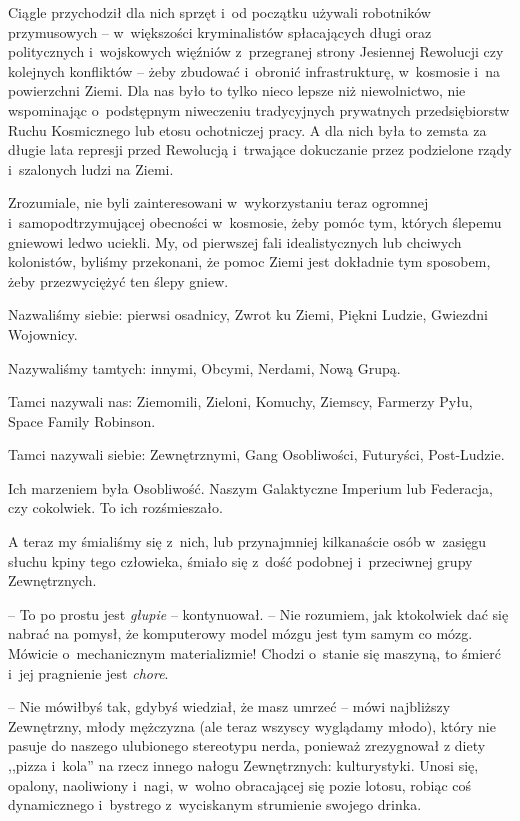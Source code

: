 \documentclass[oneside,polish,11pt,sfheadings]{mwbk}
\begin{document}
Ciągle przychodził dla nich sprzęt i~od początku używali robotników
przymusowych -- w~większości kryminalistów spłacających długi oraz
politycznych i~wojskowych więźniów z~przegranej strony Jesiennej
Rewolucji czy kolejnych konfliktów -- żeby zbudować i~obronić
infrastrukturę, w~kosmosie i~na powierzchni Ziemi. Dla nas było to tylko
nieco lepsze niż niewolnictwo, nie wspominając o~podstępnym niweczeniu
tradycyjnych prywatnych przedsiębiorstw Ruchu Kosmicznego lub etosu
ochotniczej pracy. A dla nich była to zemsta za długie lata represji
przed Rewolucją i~trwające dokuczanie przez podzielone rządy i~szalonych
ludzi na Ziemi.

Zrozumiale, nie byli zainteresowani w~wykorzystaniu teraz ogromnej i~samopodtrzymującej obecności w~kosmosie, żeby pomóc tym, których ślepemu
gniewowi ledwo uciekli. My, od pierwszej fali idealistycznych lub
chciwych kolonistów, byliśmy przekonani, że pomoc Ziemi jest dokładnie
tym sposobem, żeby przezwyciężyć ten ślepy gniew.

Nazwaliśmy siebie: pierwsi osadnicy, Zwrot ku Ziemi, Piękni Ludzie,
Gwiezdni Wojownicy.

Nazywaliśmy tamtych: innymi, Obcymi, Nerdami, Nową Grupą.

Tamci nazywali nas: Ziemomili, Zieloni, Komuchy, Ziemscy, Farmerzy Pyłu,
Space Family Robinson.

Tamci nazywali siebie: Zewnętrznymi, Gang Osobliwości, Futuryści,
Post-Ludzie.

Ich marzeniem była Osobliwość. Naszym Galaktyczne Imperium lub
Federacja, czy cokolwiek. To ich rozśmieszało.

A teraz my śmialiśmy się z~nich, lub przynajmniej kilkanaście osób w~zasięgu słuchu kpiny tego człowieka, śmiało się z~dość podobnej i~przeciwnej grupy Zewnętrznych.

-- To po prostu jest \textit{głupie} -- kontynuował. -- Nie rozumiem, jak
ktokolwiek dać się nabrać na pomysł, że komputerowy model mózgu jest tym
samym co mózg. Mówicie o~mechanicznym materializmie! Chodzi o~stanie się
maszyną, to śmierć i~jej pragnienie jest \textit{chore}.

-- Nie mówiłbyś tak, gdybyś wiedział, że masz umrzeć -- mówi najbliższy
Zewnętrzny, młody mężczyzna (ale teraz wszyscy wyglądamy młodo), który
nie pasuje do naszego ulubionego stereotypu nerda, ponieważ zrezygnował
z diety ,,pizza i~kola'' na rzecz innego nałogu Zewnętrznych:
kulturystyki. Unosi się, opalony, naoliwiony i~nagi, w~wolno obracającej
się pozie lotosu, robiąc coś dynamicznego i~bystrego z~wyciskanym
strumienie swojego drinka. 
\end{document}
